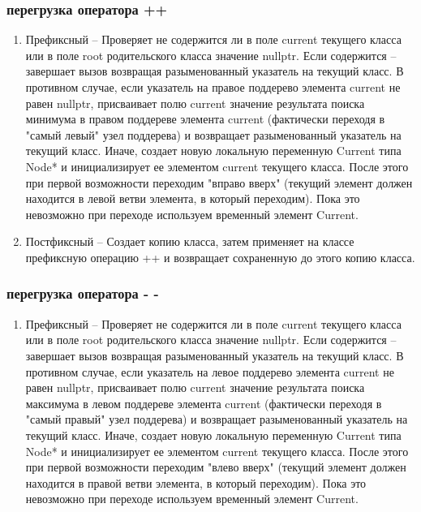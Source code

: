 \documentclass[a4paper,12pt]{article}
\begin{document}
\begin{enumerate}
      \subsubsection{перегрузка оператора ++}
      \begin{enumerate}
      \item Префиксный --
     Проверяет не содержится ли в поле current текущего класса или в поле root родительского класса значение nullptr. Если содержится -- завершает вызов возвращая разыменованный указатель на текущий класс. В противном случае, если указатель на правое поддерево элемента current не равен nullptr, присваивает полю current значение результата поиска минимума в правом поддереве элемента current (фактически переходя в "самый левый" узел поддерева) и возвращает разыменованный указатель на текущий класс. Иначе, создает новую локальную переменную Current типа Node* и инициализирует ее элементом current текущего класса. После этого при первой возможности переходим "вправо вверх" (текущий элемент должен находится в левой ветви элемента, в который переходим). Пока это невозможно при переходе используем временный элемент Current.
     
      \item Постфиксный --
      Создает копию класса, затем применяет на классе префиксную операцию ++ и возвращает сохраненную до этого копию класса.
    
      \end{enumerate}
      
      \subsubsection{перегрузка оператора - -}
      \begin{enumerate}
      \item Префиксный --
      Проверяет не содержится ли в поле current текущего класса или в поле root родительского класса значение nullptr. Если содержится -- завершает вызов возвращая разыменованный указатель на текущий класс. В противном случае, если указатель на левое поддерево элемента current не равен nullptr, присваивает полю current значение результата поиска максимума в левом поддереве элемента current (фактически переходя в "самый правый" узел поддерева) и возвращает разыменованный указатель на текущий класс. Иначе, создает новую локальную переменную Current типа Node* и инициализирует ее элементом current текущего класса. После этого при первой возможности переходим "влево вверх" (текущий элемент должен находится в правой ветви элемента, в который переходим). Пока это невозможно при переходе используем временный элемент Current.
     

\end{enumerate}
\end{enumerate}
\end{document}
